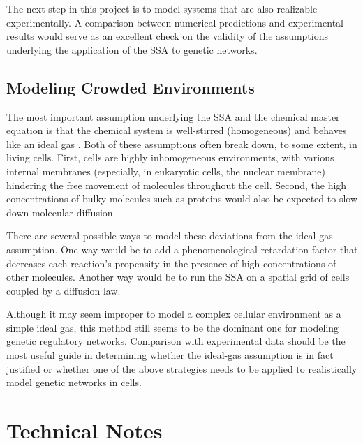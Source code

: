 \documentclass[english,letterpaper,12pt]{report}
\begin{document}
\begin{doublespacing}
The next step in this project is to model systems that are also realizable experimentally. A comparison between numerical predictions and experimental results would serve as an excellent check on the validity of the assumptions underlying the application of the SSA to genetic networks.

\section{Modeling Crowded Environments} %
\label{sub:diffusion-crowded}

The most important assumption underlying the SSA and the chemical master equation is that the chemical system is well-stirred (homogeneous) and behaves like an ideal gas \cite{langevin-limit}. Both of these assumptions often break down, to some extent, in living cells. First, cells are highly inhomogeneous environments, with various internal membranes (especially, in eukaryotic cells, the nuclear membrane) hindering the free movement of molecules throughout the cell. Second, the high concentrations of bulky molecules such as proteins would also be expected to slow down molecular diffusion~\cite{art-cells-crowding}.

There are several possible ways to model these deviations from the ideal-gas assumption. One way would be to add a phenomenological retardation factor that decreases each reaction's propensity in the presence of high concentrations of other molecules. Another way would be to run the SSA on a spatial grid of cells coupled by a diffusion law.

Although it may seem improper to model a complex cellular environment as a simple ideal gas, this method still seems to be the dominant one for modeling genetic regulatory networks. Comparison with experimental data should be the most useful guide in determining whether the ideal-gas assumption is in fact justified or whether one of the above strategies needs to be applied to realistically model genetic networks in cells.




\appendix

\chapter{Technical Notes} %
\label{sec:tech-notes}


\end{doublespacing}
\end{document}
